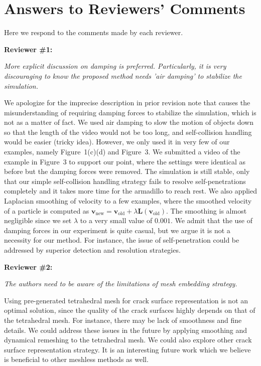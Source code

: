 \section{Answers to Reviewers' Comments}

Here we respond to the comments made by each reviewer.

\noindent{}\textbf{Reviewer \#1:}

\emph{More explicit discussion on damping is preferred. Particularly, it is very discouraging to know the proposed method needs 'air damping' to stabilize the simulation.}

We apologize for the imprecise description in prior revision note that causes the misunderstanding of requiring damping forces to stabilize the simulation, which is not as a matter of fact. We used air damping to slow the motion of objects down so that the length of the video would not be too long, and self-collision handling would be easier (tricky idea). However, we only used it in very few of our examples, namely Figure~1(c)(d) and Figure~3. We submitted a video of the example in Figure~3 to support our point, where the settings were identical as before but the damping forces were removed. The simulation is still stable, only that our simple self-collision handling strategy fails to resolve self-penetrations completely and it takes more time for the armadillo to reach rest. We also applied Laplacian smoothing of velocity to a few examples, where the smoothed velocity of a particle is computed as $\mathbf{v}_{\mathrm{new}}=\mathbf{v}_{\mathrm{old}}+\lambda \mathbf{L}(\mathbf{v}_{\mathrm{old}})$. The smoothing is almost negligible since we set $\lambda$ to a very small value of $0.001$. We admit that the use of damping forces in our experiment is quite casual, but we argue it is not a necessity for our method. For instance, the issue of self-penetration could be addressed by superior detection and resolution strategies.

\noindent{}\textbf{Reviewer \#2:}

\emph{The authors need to be aware of the limitations of mesh embedding strategy.}

Using pre-generated tetrahedral mesh for crack surface representation is not an optimal solution, since the quality of the crack surfaces highly depends on that of the tetrahedral mesh. For instance, there may be lack of smoothness and fine details. We could address these issues in the future by applying smoothing and dynamical remeshing to the tetrahedral mesh. We could also explore other crack surface representation strategy. It is an interesting future work which we believe is beneficial to other meshless methods as well.

